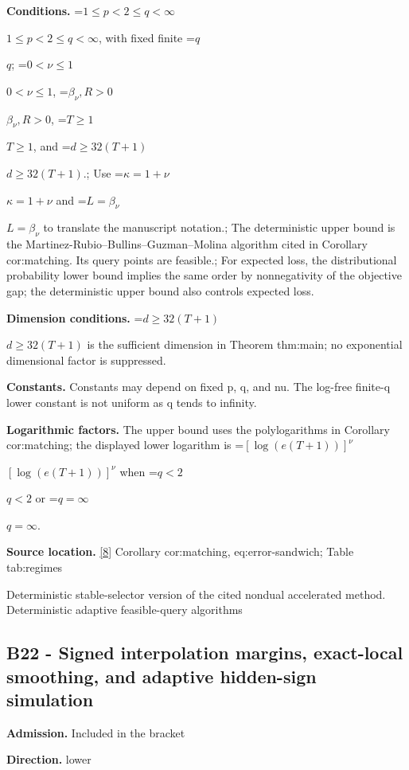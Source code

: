 \documentclass[10pt,a4paper]{article}
\newcommand{\AtlasMath}[1]{\par\begingroup\centering\setbox0=\hbox{$\displaystyle #1$}\ifdim\wd0>1.4\linewidth\typeout{ATLAS WIDE FORMULA: \the\wd0}\fi\ifdim\wd0>\linewidth\resizebox{\linewidth}{!}{\box0}\else\box0\fi\par\endgroup}
\newcommand{\AtlasInlineMath}[1]{\begingroup\setbox0=\hbox{$#1$}\ifdim\wd0>.4\linewidth\endgroup\AtlasMath{#1}\else\endgroup$#1$\fi}
\begin{document}
\textbf{Conditions.} \AtlasInlineMath{1\le p<2\le q<\infty}, with fixed finite \AtlasInlineMath{q}; \AtlasInlineMath{0<\nu\le1}, \AtlasInlineMath{\beta_\nu,R>0}, \AtlasInlineMath{T\ge1}, and \AtlasInlineMath{d\ge32(T+1)}.; Use \AtlasInlineMath{\kappa=1+\nu} and \AtlasInlineMath{L=\beta_\nu} to translate the manuscript notation.; The deterministic upper bound is the Martinez-Rubio--Bullins--Guzman--Molina algorithm cited in Corollary cor:matching. Its query points are feasible.; For expected loss, the distributional probability lower bound implies the same order by nonnegativity of the objective gap; the deterministic upper bound also controls expected loss.



\textbf{Dimension conditions.} \AtlasInlineMath{d\ge32(T+1)} is the sufficient dimension in Theorem thm:main; no exponential dimensional factor is suppressed.



\textbf{Constants.} Constants may depend on fixed p, q, and nu. The log-free finite-q lower constant is not uniform as q tends to infinity.



\textbf{Logarithmic factors.} The upper bound uses the polylogarithms in Corollary cor:matching; the displayed lower logarithm is \AtlasInlineMath{[\log(e(T+1))]^\nu} when \AtlasInlineMath{q<2} or \AtlasInlineMath{q=\infty}.



\textbf{Source location.} \href{https://github.com/WU-Wendao/Colombo/blob/main/colombo_sensorium/Complexity_altas/data/sources/colombo/B1/manuscript.pdf}{[8]} Corollary cor:matching, eq:error-sandwich; Table tab:regimes



Deterministic stable-selector version of the cited nondual accelerated method. Deterministic adaptive feasible-query algorithms



\subsection{B22 - Signed interpolation margins, exact-local smoothing, and adaptive hidden-sign simulation}


\textbf{Admission.} Included in the bracket



\textbf{Direction.} lower
\end{document}
